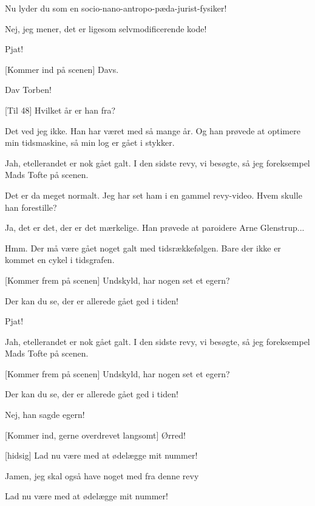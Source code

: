 \documentclass[a4paper,11pt]{article}
\begin{document}
\begin{sketch}
   Nu lyder du som en socio-nano-antropo-pæda-jurist-fysiker!
  
   Nej, jeg mener, det er ligesom selvmodificerende kode!
  
   Pjat!
  
   [Kommer ind på scenen] Davs.
  
   Dav Torben!
  
   [Til 48] Hvilket år er han fra?
  
   Det ved jeg ikke. Han har været med så mange år. Og han
  prøvede at optimere min tidsmaskine, så min log er gået i stykker.
  
   Jah, etellerandet er nok gået galt. I den sidste revy, vi
  besøgte, så jeg foreksempel Mads Tofte på scenen.
  
   Det er da meget normalt. Jeg har set ham i en gammel
  revy-video. Hvem skulle han forestille?
  
   Ja, det er det, der er det mærkelige. Han prøvede at
  paroidere Arne Glenstrup...
  
   Hmm. Der må være gået noget galt med tidsrækkefølgen. Bare
  der ikke er kommet en cykel i tidsgrafen.
  
   [Kommer frem på scenen] Undskyld, har nogen set et egern?
  
   Der kan du se, der er allerede gået ged i tiden!
  
   Pjat!
  
   Jah, etellerandet er nok gået galt. I den sidste revy, vi
  besøgte, så jeg foreksempel Mads Tofte på scenen.
  
   [Kommer frem på scenen] Undskyld, har nogen set et egern?
  
   Der kan du se, der er allerede gået ged i tiden!
  
   Nej, han sagde egern!
  
   [Kommer ind, gerne overdrevet langsomt] Ørred! 
  
   [hidsig] Lad nu være med at ødelægge mit nummer!
  
   Jamen, jeg skal også have noget med fra denne revy
  
   Lad nu være med at ødelægge mit nummer!
  

\end{sketch}
\end{document}
